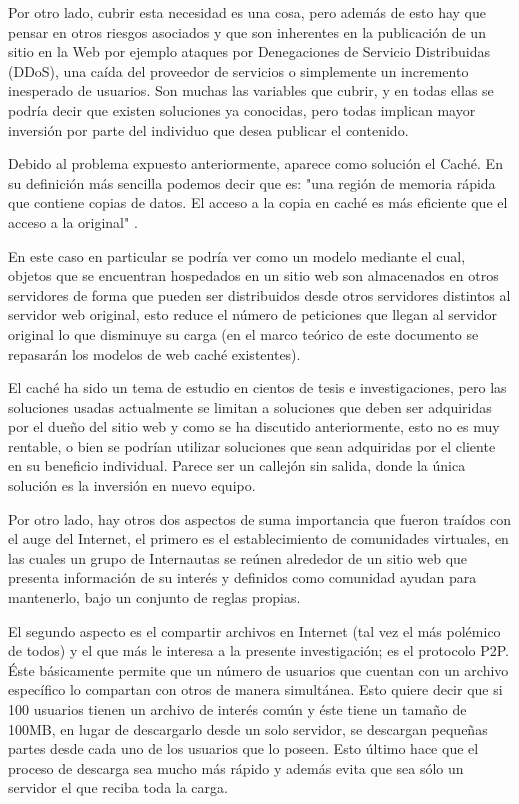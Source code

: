 Por otro lado, cubrir esta necesidad es una cosa, pero además de esto hay que pensar en otros riesgos asociados y que son inherentes en la publicación de un sitio en la Web por ejemplo ataques por Denegaciones de Servicio Distribuidas (DDoS), una caída del proveedor de servicios o simplemente un incremento inesperado de usuarios. Son muchas las variables que cubrir, y en todas ellas se podría decir que existen soluciones ya conocidas, pero todas implican mayor inversión por parte del individuo que desea publicar el contenido. 

Debido al problema expuesto anteriormente, aparece como solución el Caché. En su definición más sencilla podemos decir que es: "una región de memoria rápida que contiene copias de datos. El acceso a la copia en caché es más eficiente que el acceso a la original" \cite{silberschatz:2008}. 

En este caso en particular se podría ver como un modelo mediante el cual, objetos que se encuentran hospedados en un sitio web son almacenados en otros servidores de forma que pueden ser distribuidos desde otros servidores distintos al servidor web original, esto reduce el número de peticiones que llegan al servidor original lo que disminuye su carga (en el marco teórico de este documento se repasarán los modelos de web caché existentes). 

El caché ha sido un tema de estudio en cientos de tesis e investigaciones, pero las soluciones usadas actualmente se limitan a soluciones que deben ser adquiridas por el dueño del sitio web y como se ha discutido anteriormente, esto no es muy rentable, o bien se podrían utilizar soluciones que sean adquiridas por el cliente en su beneficio individual. Parece ser un callejón sin salida, donde la única solución es la inversión en nuevo equipo.

Por otro lado, hay otros dos aspectos de suma importancia que fueron traídos con el auge del Internet, el primero es el establecimiento de comunidades virtuales, en las cuales un grupo de Internautas se reúnen alrededor de un sitio web que presenta información de su interés y definidos como comunidad ayudan para mantenerlo, bajo un conjunto de reglas propias. 

El segundo aspecto es el compartir archivos en Internet (tal vez el más polémico de todos) y el que más le interesa a la presente investigación; es el protocolo P2P. Éste básicamente permite que un número de usuarios que cuentan con un archivo específico lo compartan con otros de manera simultánea. Esto quiere decir que si 100 usuarios tienen un archivo de interés común y éste tiene un tamaño de 100MB, en lugar de descargarlo desde un solo servidor, se descargan pequeñas partes desde cada uno de los usuarios que lo poseen. Esto último hace que el proceso de descarga sea mucho más rápido y además evita que sea sólo un servidor el que reciba toda la carga.

